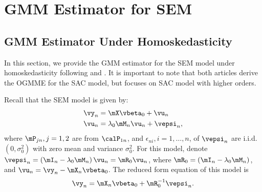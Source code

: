 \documentclass[english,12pt]{book}\usepackage[]{graphicx}\usepackage[]{xcolor}
\begin{document}
\section{GMM Estimator for SEM}\label{sec:gmm-sem}

\subsection{GMM Estimator Under Homoskedasticity}

In this section, we provide the GMM estimator for the SEM model under homoskedasticity following \cite{lee2010efficient} and \cite{liu2010efficient}. It is important to note that both articles derive the OGMME for the SAC model, but \cite{lee2010efficient} focuses on SAC model with higher orders. 

Recall that the SEM model is given by:
\begin{equation*}
 \begin{aligned}
  \vy_n  & = \mX\vbeta_0 +  \vu_n  \\
  \vu_n & =\lambda_0 \mM_n\vu_n + \vepsi_n, 
\end{aligned}
\end{equation*}
%
where $\mP_{jn}, j = 1,2$ are from $\calP_{1n}$, and $\epsilon_{ni}, i = 1, \ldots, n$, of $\vepsi_n$  are i.i.d. $(0, \sigma^2_0)$ with zero mean and variance $\sigma_0^2$. For this model, denote $\vepsi_n = \left(\mI_n - \lambda_0\mM_n\right)\vu_n = \mR_0\vu_n$, where $\mR_0 = \left(\mI_n - \lambda_0\mM_n\right)$, and $\vu_n = \vy_n - \mX_n\vbeta_0$. The reduced form equation of this model is
\begin{equation}\label{eq:reduced-sem-gmm}
\vy_n = \mX_n\vbeta_0 + \mR_0^{-1}\vepsi_n. 
\end{equation}
\end{document}

